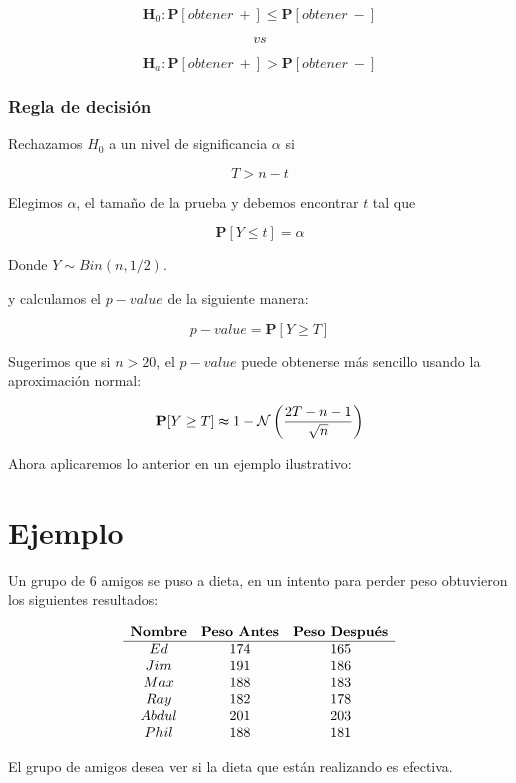 \documentclass[
  a4paper,
  oneside,
  openany]{book}
\begin{document}
\[\textbf{H}_0: \mathbf{P}[obtener\ +] \leq \mathbf{P}[obtener\ -]\]

\[vs\]

\[\textbf{H}_a: \mathbf{P}[obtener\ +] > \mathbf{P}[obtener\ -]\]

\hypertarget{regla-de-decisiuxf3n-8}{%
\subsubsection*{Regla de decisión}\label{regla-de-decisiuxf3n-8}}


Rechazamos \(H_0\) a un nivel de significancia \(\alpha\) si

\[T > n-t\]

Elegimos \(\alpha\), el tamaño de la prueba y debemos encontrar \(t\) tal que

\[\mathbf{P}[Y \leq t]=\alpha\]

Donde \(Y \sim Bin (n,1/2)\).

y calculamos el \(p-value\) de la siguiente manera:

\[p-value=\mathbf{P}[Y\geq T]\]

Sugerimos que si \(n > 20\), el \(p-value\) puede obtenerse más sencillo usando la aproximación normal:

\[\mathbf{P}[Y\geq T] \thickapprox 1- \mathcal{N} \left(\frac{2T-n-1}{\sqrt{n}}\right)\]

Ahora aplicaremos lo anterior en un ejemplo ilustrativo:

\hypertarget{ejemplo-2}{%
\section{Ejemplo}\label{ejemplo-2}}

Un grupo de 6 amigos se puso a dieta, en un intento para perder peso obtuvieron los siguientes resultados:

\[
\begin{array}{c c c c } 
\textbf{Nombre} & \textbf{Peso Antes} & \textbf{Peso Después} \\
\hline
Ed    & 174 & 165 \\
Jim   & 191 & 186 \\
Max   & 188 & 183 \\
Ray   & 182 & 178 \\
Abdul & 201 & 203 \\
Phil  & 188 & 181 \\
\end{array} 
\]

El grupo de amigos desea ver si la dieta que están realizando es efectiva.
\end{document}
